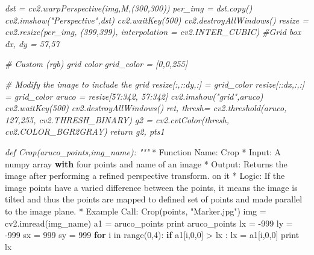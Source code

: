 \documentclass[]{article}
\newenvironment{Shaded}{}{}
\newcommand{\DecValTok}[1]{\textcolor[rgb]{0.25,0.63,0.44}{{#1}}}
\newcommand{\StringTok}[1]{\textcolor[rgb]{0.25,0.44,0.63}{{#1}}}
\newcommand{\CommentTok}[1]{\textcolor[rgb]{0.38,0.63,0.69}{\textit{{#1}}}}
\newcommand{\ControlFlowTok}[1]{\textcolor[rgb]{0.00,0.44,0.13}{\textbf{{#1}}}}
\newcommand{\OperatorTok}[1]{\textcolor[rgb]{0.40,0.40,0.40}{{#1}}}
\newcommand{\BuiltInTok}[1]{{#1}}
\newcommand{\NormalTok}[1]{{#1}}
\begin{document}
\begin{Shaded}
\begin{Highlighting}[]
\CommentTok{    dst = cv2.warpPerspective(img,M,(300,300))}
\CommentTok{    per_img = dst.copy()}
\CommentTok{    cv2.imshow("Perspective",dst)}
\CommentTok{    cv2.waitKey(500)}
\CommentTok{    cv2.destroyAllWindows()}
\CommentTok{    resize = cv2.resize(per_img, (399,399), interpolation = cv2.INTER_CUBIC)}
\CommentTok{    #Grid box}
\CommentTok{    dx, dy = 57,57}

\CommentTok{    # Custom (rgb) grid color}
\CommentTok{    grid_color = [0,0,255]}

\CommentTok{    # Modify the image to include the grid}
\CommentTok{    resize[:,::dy,:] = grid_color}
\CommentTok{    resize[::dx,:,:] = grid_color}
\CommentTok{    aruco = resize[57:342, 57:342]}
\CommentTok{    cv2.imshow("grid",aruco)}
\CommentTok{    cv2.waitKey(500)}
\CommentTok{    cv2.destroyAllWindows()}
\CommentTok{    ret, thresh= cv2.threshold(aruco, 127,255, cv2.THRESH_BINARY)}
\CommentTok{    g2 = cv2.cvtColor(thresh, cv2.COLOR_BGR2GRAY)}
\CommentTok{    return g2, pts1}




\CommentTok{def Crop(aruco_points,img_name):}
\CommentTok{"""}
    \OperatorTok{*} \NormalTok{Function Name:    Crop}
    \OperatorTok{*} \NormalTok{Input:        A numpy array }\ControlFlowTok{with} \NormalTok{four points }\OperatorTok{and} \NormalTok{name of an image}
    \OperatorTok{*} \NormalTok{Output:       Returns the image after performing a refined perspective transform.}
                        \NormalTok{on it}
    \OperatorTok{*} \NormalTok{Logic:        If the image points have a varied difference between the points, it means the image }\OperatorTok{is}
                        \NormalTok{tilted }\OperatorTok{and} \NormalTok{thus the points are mapped to defined }\BuiltInTok{set} \NormalTok{of points }\OperatorTok{and} \NormalTok{made parallel to the                                  }
                        \NormalTok{image plane.  }
    \OperatorTok{*} \NormalTok{Example Call: Crop(points, }\StringTok{"Marker.jpg"}\NormalTok{)}
    \NormalTok{img }\OperatorTok{=} \NormalTok{cv2.imread(img_name)}
    \NormalTok{a1 }\OperatorTok{=} \NormalTok{aruco_points}
    \BuiltInTok{print} \NormalTok{aruco_points}
    \NormalTok{lx }\OperatorTok{=} \OperatorTok{-}\DecValTok{999}
    \NormalTok{ly }\OperatorTok{=} \OperatorTok{-}\DecValTok{999}
    \NormalTok{sx }\OperatorTok{=} \DecValTok{999}
    \NormalTok{sy }\OperatorTok{=} \DecValTok{999}
    \ControlFlowTok{for} \NormalTok{i }\OperatorTok{in} \BuiltInTok{range}\NormalTok{(}\DecValTok{0}\NormalTok{,}\DecValTok{4}\NormalTok{):}
        \ControlFlowTok{if} \NormalTok{a1[i,}\DecValTok{0}\NormalTok{,}\DecValTok{0}\NormalTok{] }\OperatorTok{>} \NormalTok{lx :}
            \NormalTok{lx }\OperatorTok{=} \NormalTok{a1[i,}\DecValTok{0}\NormalTok{,}\DecValTok{0}\NormalTok{]}
    \BuiltInTok{print} \NormalTok{lx}


\end{Highlighting}
\end{Shaded}
\end{document}
